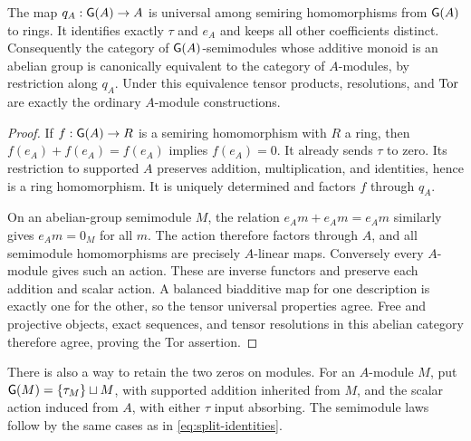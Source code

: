 \begin{theorem}\label{thm:ring-recovery}
The map $q_A:\mathsf G(A)\to A$ is universal among semiring homomorphisms from
$\mathsf G(A)$ to rings. It identifies exactly $\tau$ and $e_A$ and keeps all
other coefficients distinct. Consequently the category of
$\mathsf G(A)$-semimodules whose additive monoid is an abelian group is
canonically equivalent to the category of $A$-modules, by restriction
along $q_A$. Under this equivalence tensor products, resolutions, and
$\operatorname{Tor}$ are exactly the ordinary $A$-module constructions.
\end{theorem}
\begin{proof}
If $f:\mathsf G(A)\to R$ is a semiring homomorphism with $R$ a ring, then
$f(e_A)+f(e_A)=f(e_A)$ implies $f(e_A)=0$. It already sends $\tau$ to
zero. Its restriction to supported $A$ preserves addition,
multiplication, and identities, hence is a ring homomorphism. It is
uniquely determined and factors $f$ through $q_A$.

On an abelian-group semimodule $M$, the relation
$e_Am+e_Am=e_Am$ similarly gives $e_Am=0_M$ for all $m$. The action
therefore factors through $A$, and all semimodule homomorphisms are
precisely $A$-linear maps. Conversely every $A$-module gives such an
action. These are inverse functors and preserve each addition and
scalar action. A balanced biadditive map for one description is exactly
one for the other, so the tensor universal properties agree. Free and
projective objects, exact sequences, and tensor resolutions in this
abelian category therefore agree, proving the Tor assertion.
\end{proof}

There is also a way to retain the two zeros on modules. For an $A$-module
$M$, put $\mathsf G(M)=\{\tau_M\}\sqcup M$, with supported addition inherited
from $M$, and the scalar action induced from $A$, with either $\tau$
input absorbing. The semimodule laws follow by the same cases as in
\eqref{eq:split-identities}.

